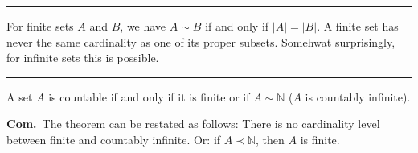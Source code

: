 \documentclass[a4paper]{extarticle}
\newcommand{\Proof}{\textbf{Proof.}\ }
\newcommand{\Com}{\textbf{Com.}\ }
\newcommand{\Ex}{\textbf{Example:}\ }
\newcommand{\N}{\mathbb{N}}
\newcommand{\relsim}{\mathrel{\sim}}
\newcommand{\sep}{\vspace{5pt}\noindent\hrule\vspace{5pt}}
\begin{document}
\begin{multicols*}{2}

\sep

\Thm For finite sets $A$ and $B$, we have $A\relsim B$ if and only if
$|A|=|B|$. A finite set has never the same cardinality as one of its proper
subsets. Somehwat surprisingly, for infinite sets this is possible.

\sep

\Thm A set $A$ is countable if and only if it is finite or if $A\sim \N$
($A$ is countably infinite).

\Com The theorem can be restated as follows: There is no cardinality level
between finite and countably infinite. Or: if $A\prec \N$, then $A$ is finite.


\end{multicols*}
\end{document}
